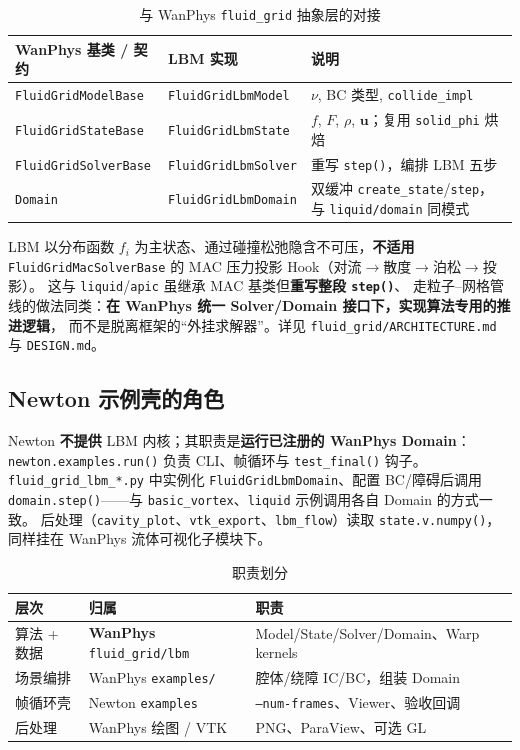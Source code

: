 \documentclass[UTF8,a4paper,11pt]{ctexart}
\newcommand{\vecu}{\mathbf{u}}
\begin{document}
\begin{table}[H]
  \centering
  \caption{与 WanPhys \texttt{fluid\_grid} 抽象层的对接}
  \begin{tabular}{@{}llp{7.2cm}@{}}
    \toprule
    WanPhys 基类 / 契约 & LBM 实现 & 说明 \\
    \midrule
    \texttt{FluidGridModelBase} & \texttt{FluidGridLbmModel} & $\nu$, BC 类型, \texttt{collide\_impl} \\
    \texttt{FluidGridStateBase} & \texttt{FluidGridLbmState} & $f$, $F$, $\rho$, $\vecu$；复用 \texttt{solid\_phi} 烘焙 \\
    \texttt{FluidGridSolverBase} & \texttt{FluidGridLbmSolver} & 重写 \texttt{step()}，编排 LBM 五步 \\
    \texttt{Domain} & \texttt{FluidGridLbmDomain} & 双缓冲 \texttt{create\_state}/\texttt{step}，与 \texttt{liquid/domain} 同模式 \\
    \bottomrule
  \end{tabular}
\end{table}

LBM 以分布函数 $f_i$ 为主状态、通过碰撞松弛隐含不可压，\textbf{不适用}
\texttt{FluidGridMacSolverBase} 的 MAC 压力投影 Hook（对流$\to$散度$\to$泊松$\to$投影）。
这与 \texttt{liquid}/\texttt{apic} 虽继承 MAC 基类但\textbf{重写整段 \texttt{step()}}、
走粒子--网格管线的做法同类：\textbf{在 WanPhys 统一 Solver/Domain 接口下，实现算法专用的推进逻辑}，
而不是脱离框架的“外挂求解器”。详见 \texttt{fluid\_grid/ARCHITECTURE.md} 与 \texttt{DESIGN.md}。

\subsection{Newton 示例壳的角色}

Newton \textbf{不提供} LBM 内核；其职责是\textbf{运行已注册的 WanPhys Domain}：
\texttt{newton.examples.run()} 负责 CLI、帧循环与 \texttt{test\_final()} 钩子。
\texttt{fluid\_grid\_lbm\_*.py} 中实例化 \texttt{FluidGridLbmDomain}、配置 BC/障碍后调用
\texttt{domain.step()}——与 \texttt{basic\_vortex}、\texttt{liquid} 示例调用各自 Domain 的方式一致。
后处理（\texttt{cavity\_plot}、\texttt{vtk\_export}、\texttt{lbm\_flow}）读取 \texttt{state.v.numpy()}，
同样挂在 WanPhys 流体可视化子模块下。

\begin{table}[H]
  \centering
  \caption{职责划分}
  \begin{tabular}{@{}p{3.2cm}p{4.5cm}p{6cm}@{}}
    \toprule
    层次 & 归属 & 职责 \\
    \midrule
    算法 + 数据 & \textbf{WanPhys} \texttt{fluid\_grid/lbm} & Model/State/Solver/Domain、Warp kernels \\
    场景编排 & WanPhys \texttt{examples/} & 腔体/绕障 IC/BC，组装 Domain \\
    帧循环壳 & Newton \texttt{examples} & \texttt{--num-frames}、Viewer、验收回调 \\
    后处理 & WanPhys 绘图 / VTK & PNG、ParaView、可选 GL \\
    \bottomrule
  \end{tabular}
\end{table}
\end{document}
